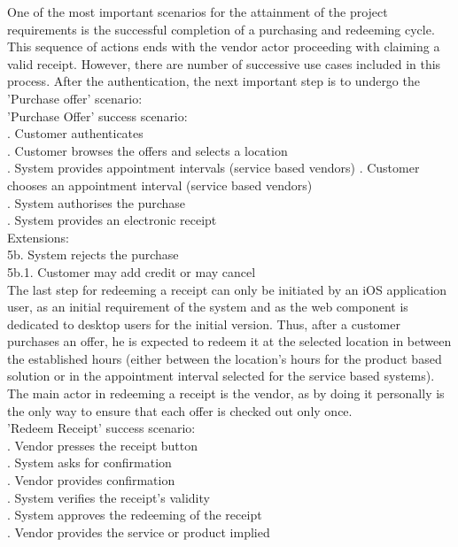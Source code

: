 One of the most important scenarios for the attainment of the project requirements is the successful completion of a purchasing and redeeming cycle. This sequence of actions ends with the vendor actor proceeding with claiming a valid receipt. However, there are number of successive use cases included in this process. After the authentication, the next important step is to undergo the 'Purchase offer' scenario:\\

\noindent 'Purchase Offer' success scenario:\\
. Customer authenticates\\
. Customer browses the offers and selects a location\\
. System provides appointment intervals (service based vendors)
. Customer chooses an appointment interval (service based vendors)\\
. System authorises the purchase\\
. System provides an electronic receipt\\
Extensions:\\
\indent 5b. System rejects the purchase\\
\indent\indent 5b.1. Customer may add credit or may cancel\\

The last step for redeeming a receipt can only be initiated by an iOS application user, as an initial requirement of the system and as the web component is dedicated to desktop users for the initial version. Thus, after a customer purchases an offer, he is expected to redeem it at the selected location in between the established hours (either between the location's hours for the product based solution or in the appointment interval selected for the service based systems). The main actor in redeeming a receipt is the vendor, as by doing it personally is the only way to ensure that each offer is checked out only once.\\

\noindent 'Redeem Receipt' success scenario:\\
. Vendor presses the receipt button\\
. System asks for confirmation\\
. Vendor provides confirmation\\
. System verifies the receipt's validity\\
. System approves the redeeming of the receipt\\
. Vendor provides the service or product implied\\

